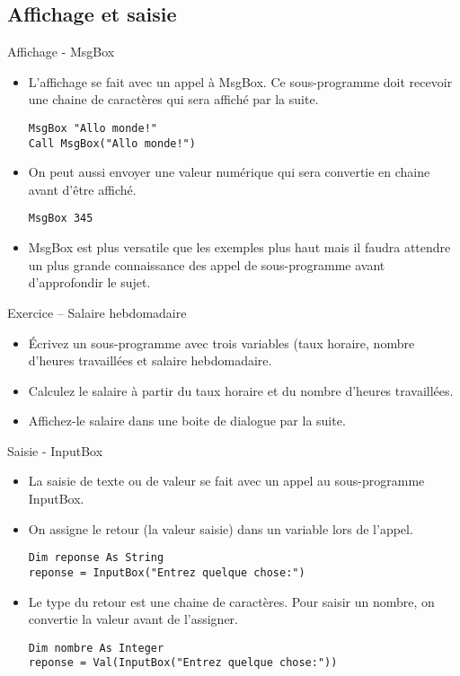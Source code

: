 \documentclass[aspectratio=169,usenames,dvipsnames]{beamer}
\begin{document}
    \subsection{Affichage et saisie}
    \begin{frame}[fragile]{Affichage - MsgBox}
        \begin{itemize}
            \item L’affichage se fait avec un appel à MsgBox. Ce sous-programme doit recevoir une chaine de caractères qui sera affiché par la suite.
            \begin{lstlisting}
MsgBox "Allo monde!"
Call MsgBox("Allo monde!")
            \end{lstlisting}
            \item On peut aussi envoyer une valeur numérique qui sera convertie en chaine avant d’être affiché.
            \begin{lstlisting}
MsgBox 345
            \end{lstlisting}
            \item MsgBox est plus versatile que les exemples plus haut mais il faudra attendre un plus grande connaissance des appel de sous-programme avant d’approfondir le sujet.

        \end{itemize}
    \end{frame}
    \begin{frame}{Exercice – Salaire hebdomadaire}
        \begin{itemize}
            \item Écrivez un sous-programme avec trois variables (taux horaire, nombre d’heures travaillées et salaire hebdomadaire.
            \item Calculez le salaire à partir du taux horaire et du nombre d’heures travaillées. 
            \item Affichez-le salaire dans une boite de dialogue par la suite.
        \end{itemize}
    \end{frame}
    \begin{frame}[fragile]{Saisie - InputBox}
        \begin{itemize}
            \item La saisie de texte ou de valeur se fait avec un appel au sous-programme InputBox.
            \item On assigne le retour (la valeur saisie) dans un variable lors de l’appel.
            \begin{lstlisting}
Dim reponse As String
reponse = InputBox("Entrez quelque chose:")
            \end{lstlisting}
            \item Le type du retour est une chaine de caractères. Pour saisir un nombre, on convertie la valeur avant de l’assigner.
            \begin{lstlisting}
Dim nombre As Integer
reponse = Val(InputBox("Entrez quelque chose:"))
            \end{lstlisting}
        \end{itemize}
    \end{frame}
\end{document}
